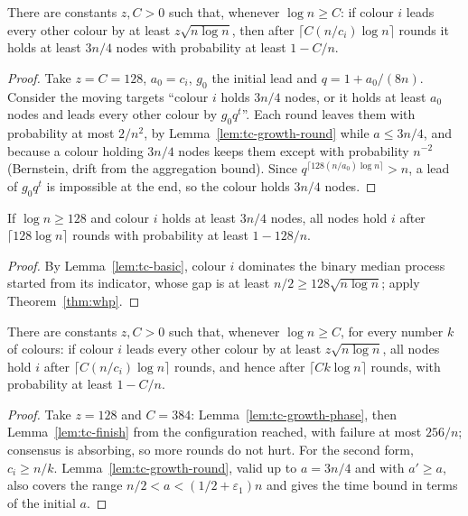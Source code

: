 \begin{lemma}\label{lem:tc-growth-phase}
\leanok{}
There are constants $z,C>0$ such that, whenever $\log n\ge C$: if colour $i$ leads every other
colour by at least $z\sqrt{n\log n}$, then after $\lceil C(n/c_i)\log n\rceil$ rounds it holds at
least $3n/4$ nodes with probability at least $1-C/n$.
\end{lemma}
\begin{proof}\leanok
Take $z=C=128$, $a_0=c_i$, $g_0$ the initial lead and $q=1+a_0/(8n)$. Consider the moving targets
``colour $i$ holds $3n/4$ nodes, or it holds at least $a_0$ nodes and leads every other colour by
$g_0q^t$''. Each round leaves them with probability at most $2/n^2$, by
Lemma~\ref{lem:tc-growth-round} while $a\le3n/4$, and because a colour holding $3n/4$ nodes keeps
them except with probability $n^{-2}$ (Bernstein, drift from the aggregation bound). Since
$q^{\lceil128(n/a_0)\log n\rceil}>n$, a lead of $g_0q^t$ is impossible at the end, so the colour
holds $3n/4$ nodes.
\end{proof}

\begin{lemma}\label{lem:tc-finish}
\leanok{}
If $\log n\ge128$ and colour $i$ holds at least $3n/4$ nodes, all nodes hold $i$ after
$\lceil128\log n\rceil$ rounds with probability at least $1-128/n$.
\end{lemma}
\begin{proof}\leanok
By Lemma~\ref{lem:tc-basic}, colour $i$ dominates the binary median process started from its
indicator, whose gap is at least $n/2\ge128\sqrt{n\log n}$; apply Theorem~\ref{thm:whp}.
\end{proof}

\begin{theorem}\label{thm:tc-plurality}
\leanok{}
There are constants $z,C>0$ such that, whenever $\log n\ge C$, for every number $k$ of colours: if
colour $i$ leads every other colour by at least $z\sqrt{n\log n}$, all nodes hold $i$ after
$\lceil C(n/c_i)\log n\rceil$ rounds, and hence after $\lceil Ck\log n\rceil$ rounds, with
probability at least $1-C/n$.
\end{theorem}
\begin{proof}\leanok
Take $z=128$ and $C=384$: Lemma~\ref{lem:tc-growth-phase}, then Lemma~\ref{lem:tc-finish} from the
configuration reached, with failure at most $256/n$; consensus is absorbing, so more rounds do not
hurt. For the second form, $c_i\ge n/k$. Lemma~\ref{lem:tc-growth-round}, valid up to $a=3n/4$ and with
$a'\ge a$, also covers the range $n/2<a<(1/2+\varepsilon_1)n$ and gives the time bound in terms of
the initial $a$.
\end{proof}

